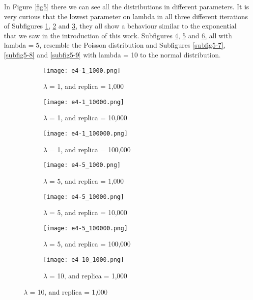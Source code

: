 \documentclass{article}
\begin{document}
In Figure \ref{fig5} there we can see all the distributions in different parameters. It is very curious that the lowest parameter on lambda in all three different iterations of Subfigures \ref{subfig5-1}, \ref{subfig5-2} and \ref{subfig5-3}, they all show a behaviour similar to the exponential that we saw in the introduction of this work. Subfigures \ref{subfig5-4}, \ref{subfig5-5} and \ref{subfig5-6}, all with lambda = 5, resemble the Poisson distribution and Subfigures \ref{subfig5-7}, \ref{subfig5-8} and \ref{subfig5-9} with lambda = 10 to the normal distribution.\\

\begin{figure}[]
\begin{subfigure}{.33\textwidth}
  \centering
  \texttt{[image: e4-1\_1000.png]}  
  \caption{$\lambda$ = 1, and replica = 1,000}
  \label{subfig5-1}
\end{subfigure}
\begin{subfigure}{.33\textwidth}
  \centering
  \texttt{[image: e4-1\_10000.png]}  
  \caption{$\lambda$ = 1, and replica = 10,000}
  \label{subfig5-2}
\end{subfigure}
\begin{subfigure}{.33\textwidth}
  \centering
  \texttt{[image: e4-1\_100000.png]}  
  \caption{ $\lambda$ = 1, and replica = 100,000}
  \label{subfig5-3}
\end{subfigure}
\newline
\begin{subfigure}{.33\textwidth}
  \centering
  \texttt{[image: e4-5\_1000.png]}  
  \caption{$\lambda$ = 5, and replica = 1,000}
  \label{subfig5-4}
\end{subfigure}
\begin{subfigure}{.33\textwidth}
  \centering
  \texttt{[image: e4-5\_10000.png]}  
  \caption{$\lambda$ = 5, and replica = 10,000}
  \label{subfig5-5}
\end{subfigure}
\begin{subfigure}{.33\textwidth}
  \centering
  \texttt{[image: e4-5\_100000.png]}  
  \caption{$\lambda$ = 5, and replica = 100,000}
  \label{subfig5-6}
\end{subfigure}
\newline
\begin{subfigure}{.33\textwidth}
  \centering
  \texttt{[image: e4-10\_1000.png]}  
  \caption{$\lambda$ = 10, and replica = 1,000}

\end{subfigure}
\end{figure}
\end{document}
